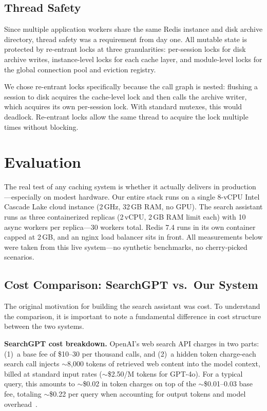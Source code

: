 \documentclass[conference]{IEEEtran}
\begin{document}
\subsection{Thread Safety}

Since multiple application workers share the same Redis instance and disk archive directory, thread safety was a requirement from day one. All mutable state is protected by re-entrant locks at three granularities: per-session locks for disk archive writes, instance-level locks for each cache layer, and module-level locks for the global connection pool and eviction registry.

We chose re-entrant locks specifically because the call graph is nested: flushing a session to disk acquires the cache-level lock and then calls the archive writer, which acquires its own per-session lock. With standard mutexes, this would deadlock. Re-entrant locks allow the same thread to acquire the lock multiple times without blocking.

\section{Evaluation}
\label{sec:evaluation}

The real test of any caching system is whether it actually delivers in production---especially on modest hardware. Our entire stack runs on a single 8-vCPU Intel Cascade Lake cloud instance (2\,GHz, 32\,GB RAM, no GPU). The search assistant runs as three containerized replicas (2\,vCPU, 2\,GB RAM limit each) with 10 async workers per replica---30 workers total. Redis 7.4 runs in its own container capped at 2\,GB, and an nginx load balancer sits in front. All measurements below were taken from this live system---no synthetic benchmarks, no cherry-picked scenarios.

\subsection{Cost Comparison: SearchGPT vs.\ Our System}

The original motivation for building the search assistant was cost. To understand the comparison, it is important to note a fundamental difference in cost structure between the two systems.

\textbf{SearchGPT cost breakdown.} OpenAI's web search API charges in two parts: (1)~a base fee of \$10--30 per thousand calls, and (2)~a hidden token charge-each search call injects ${\sim}$8{,}000 tokens of retrieved web content into the model context, billed at standard input rates (${\sim}$\$2.50/M tokens for GPT-4o). For a typical query, this amounts to ${\sim}$\$0.02 in token charges on top of the ${\sim}$\$0.01--0.03 base fee, totaling ${\sim}$\$0.22 per query when accounting for output tokens and model overhead~\cite{openai_search_pricing, openai_search_billing}.
\end{document}
